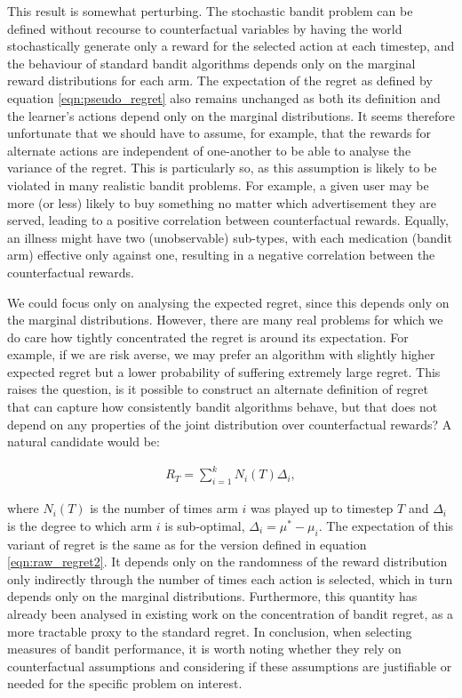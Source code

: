 \documentclass[11pt,a4paper,twoside]{report}
\newcommand{\eqn}[1]{\begin{align}#1\end{align}}
\theoremstyle{plain}
\theoremstyle{definition}
\begin{document}
This result is somewhat perturbing. The stochastic bandit problem can be defined without recourse to counterfactual variables by having the world stochastically generate only a reward for the selected action at each timestep, and the behaviour of standard bandit algorithms depends only on the marginal reward distributions for each arm. The expectation of the regret as defined by equation \ref{eqn:pseudo_regret} also remains unchanged as both its definition and the learner's actions depend only on the marginal distributions. It seems therefore unfortunate that we should have to assume, for example, that the rewards for alternate actions are independent of one-another to be able to analyse the variance of the regret. This is particularly so, as this assumption is likely to be violated in many realistic bandit problems. For example, a given user may be more (or less) likely to buy something no matter which advertisement they are served, leading to a positive correlation between counterfactual rewards. Equally, an illness might have two (unobservable) sub-types, with each medication (bandit arm) effective only against one, resulting in a negative correlation between the counterfactual rewards. 

We could focus only on analysing the expected regret, since this depends only on the marginal distributions. However, there are many real problems for which we do care how tightly concentrated the regret is around its expectation. For example, if we are risk averse, we may prefer an algorithm with slightly higher expected regret but a lower probability of suffering extremely large regret. This raises the question, is it possible to construct an alternate definition of regret that can capture how consistently bandit algorithms behave, but that does not depend on any properties of the joint distribution over counterfactual rewards? A natural candidate would be:

\eqn{
R_T = \sum_{i=1}^k N_i(T)\Delta_i, 
}

where $N_i(T)$ is the number of times arm $i$ was played up to timestep $T$ and $\Delta_i$ is the degree to which arm $i$ is sub-optimal, $\Delta_i = \mu^* - \mu_i$. The expectation of this variant of regret is the same as for the  version defined in equation \ref{eqn:raw_regret2}. It depends only on the randomness of the reward distribution only indirectly through the number of times each action is selected, which in turn depends only on the marginal distributions. Furthermore, this quantity has already been analysed in existing work on the concentration of bandit regret, \citep{Audibert2007,Audibert2009exploration} as a more tractable proxy to the standard regret. In conclusion, when selecting measures of bandit performance, it is worth noting whether they rely on counterfactual assumptions and considering if these assumptions are justifiable or needed for the specific problem on interest.
\end{document}
